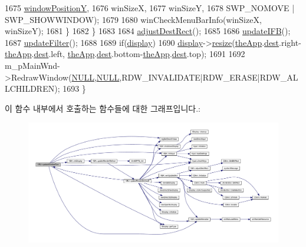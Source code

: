 \begin{DoxyCode}
1675                                \mbox{\hyperlink{class_v_b_a_a79b40ebb7ccfd4390eb0747168d07cad}{windowPositionY}},
1676                                winSizeX,
1677                                winSizeY,
1678                                SWP\_NOMOVE | SWP\_SHOWWINDOW);
1679 
1680       winCheckMenuBarInfo(winSizeX, winSizeY);
1681     \}
1682   \}
1683 
1684   \mbox{\hyperlink{class_v_b_a_acb822065cba8b15810c5a61fd05ca831}{adjustDestRect}}();
1685 
1686   \mbox{\hyperlink{class_v_b_a_ab1caa25635cd40fc3b49b5d325cc65ef}{updateIFB}}();  
1687   \mbox{\hyperlink{class_v_b_a_afbe0e6f9458f25adb848516537a91747}{updateFilter}}();
1688   
1689   \textcolor{keywordflow}{if}(\mbox{\hyperlink{class_v_b_a_a940e5bad8b3ed2436888dbcd03bfd563}{display}})
1690     \mbox{\hyperlink{class_v_b_a_a940e5bad8b3ed2436888dbcd03bfd563}{display}}->\mbox{\hyperlink{class_i_display_ad0b4ba99f59edd7a6857e3b3941b3ba2}{resize}}(\mbox{\hyperlink{_v_b_a_8cpp_a8095a9d06b37a7efe3723f3218ad8fb3}{theApp}}.\mbox{\hyperlink{class_v_b_a_aed77fc82f818810cc87c470768c75e05}{dest}}.right-\mbox{\hyperlink{_v_b_a_8cpp_a8095a9d06b37a7efe3723f3218ad8fb3}{theApp}}.\mbox{\hyperlink{class_v_b_a_aed77fc82f818810cc87c470768c75e05}{dest}}.left, 
      \mbox{\hyperlink{_v_b_a_8cpp_a8095a9d06b37a7efe3723f3218ad8fb3}{theApp}}.\mbox{\hyperlink{class_v_b_a_aed77fc82f818810cc87c470768c75e05}{dest}}.bottom-\mbox{\hyperlink{_v_b_a_8cpp_a8095a9d06b37a7efe3723f3218ad8fb3}{theApp}}.\mbox{\hyperlink{class_v_b_a_aed77fc82f818810cc87c470768c75e05}{dest}}.top);
1691   
1692   m\_pMainWnd->RedrawWindow(\mbox{\hyperlink{getopt1_8c_a070d2ce7b6bb7e5c05602aa8c308d0c4}{NULL}},\mbox{\hyperlink{getopt1_8c_a070d2ce7b6bb7e5c05602aa8c308d0c4}{NULL}},RDW\_INVALIDATE|RDW\_ERASE|RDW\_ALLCHILDREN);  
1693 \}
\end{DoxyCode}
이 함수 내부에서 호출하는 함수들에 대한 그래프입니다.\+:
\nopagebreak
\begin{figure}[H]
\begin{center}
\leavevmode
\includegraphics[width=350pt]{class_v_b_a_ac278ece4958310ce2ef8751afbad08f3_cgraph}
\end{center}
\end{figure}

